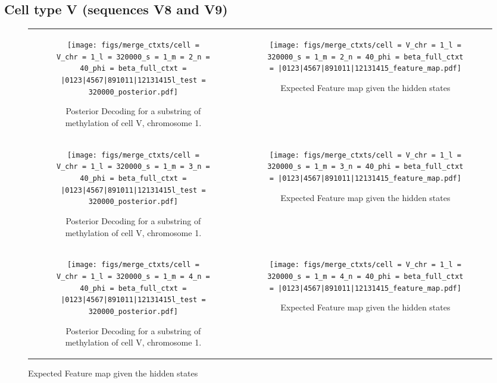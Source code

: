 \documentclass{article}
\begin{document}
\subsection{Cell type V (sequences V8 and V9)}
\begin{figure}[H]
    \begin{tabular}{cc}
      \begin{subfigure}[t]{0.4\textwidth}
        \texttt{[image: figs/merge\_ctxts/cell = V\_chr = 1\_l = 320000\_s = 1\_m = 2\_n = 40\_phi = beta\_full\_ctxt = |0123|4567|891011|12131415l\_test = 320000\_posterior.pdf]}
        \caption{Posterior Decoding for a substring of methylation of cell V, chromosome 1.}
      \end{subfigure}
      &
      \begin{subfigure}[t]{0.6\textwidth}
        \texttt{[image: figs/merge\_ctxts/cell = V\_chr = 1\_l = 320000\_s = 1\_m = 2\_n = 40\_phi = beta\_full\_ctxt = |0123|4567|891011|12131415\_feature\_map.pdf]}
        \caption{Expected Feature map given the hidden states}
      \end{subfigure}
      \\
      \begin{subfigure}[t]{0.4\textwidth}
        \texttt{[image: figs/merge\_ctxts/cell = V\_chr = 1\_l = 320000\_s = 1\_m = 3\_n = 40\_phi = beta\_full\_ctxt = |0123|4567|891011|12131415l\_test = 320000\_posterior.pdf]}
        \caption{Posterior Decoding for a substring of methylation of cell V, chromosome 1.}
      \end{subfigure}
      &
      \begin{subfigure}[t]{0.6\textwidth}
        \texttt{[image: figs/merge\_ctxts/cell = V\_chr = 1\_l = 320000\_s = 1\_m = 3\_n = 40\_phi = beta\_full\_ctxt = |0123|4567|891011|12131415\_feature\_map.pdf]}
        \caption{Expected Feature map given the hidden states}
      \end{subfigure}
      \\
      \begin{subfigure}[t]{0.4\textwidth}
        \texttt{[image: figs/merge\_ctxts/cell = V\_chr = 1\_l = 320000\_s = 1\_m = 4\_n = 40\_phi = beta\_full\_ctxt = |0123|4567|891011|12131415l\_test = 320000\_posterior.pdf]}
        \caption{Posterior Decoding for a substring of methylation of cell V, chromosome 1.}
      \end{subfigure}
      &
      \begin{subfigure}[t]{0.6\textwidth}
        \texttt{[image: figs/merge\_ctxts/cell = V\_chr = 1\_l = 320000\_s = 1\_m = 4\_n = 40\_phi = beta\_full\_ctxt = |0123|4567|891011|12131415\_feature\_map.pdf]}
        \caption{Expected Feature map given the hidden states}
      \end{subfigure}
  \end{tabular}
\end{figure}
\end{document}
